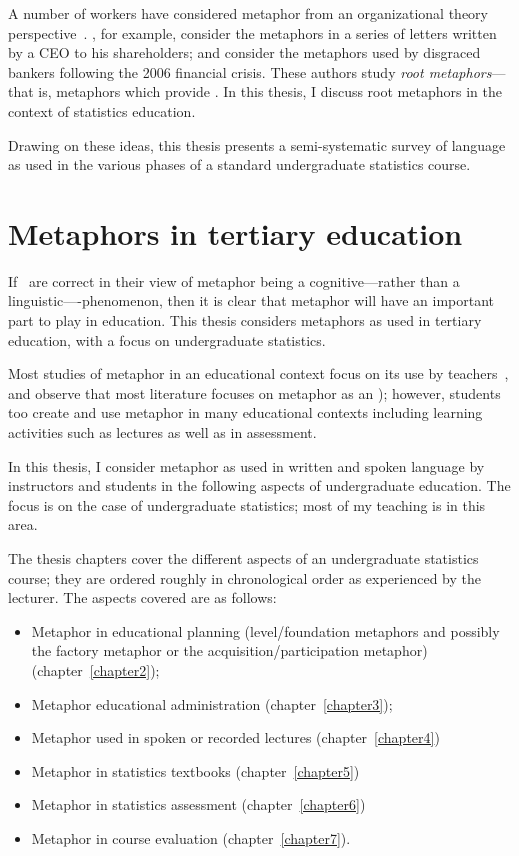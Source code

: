 A number of workers have considered metaphor from an organizational
theory perspective~\citep{cornelissen2012}.  , for
example, consider the metaphors in a series of letters written by a
CEO to his shareholders; and  consider the metaphors
used by disgraced bankers following the 2006 financial crisis.  These
authors study \emph{root metaphors}---that is, metaphors which provide
.  In this thesis, I discuss root metaphors in the
context of statistics education.

Drawing on these ideas, this thesis presents a semi-systematic survey
of language as used in the various phases of a standard undergraduate
statistics course.  

\section{Metaphors in tertiary education}


If~\citeauthor{lakoff1980} are correct in their view of metaphor being
a cognitive---rather than a linguistic----phenomenon, then it is clear
that metaphor will have an important part to play in education.  This
thesis considers metaphors as used in tertiary education, with a focus
on undergraduate statistics.

Most studies of metaphor in an educational context focus on its use by
teachers~\citep{willox2010}, and observe that most literature focuses on
metaphor as an ); however,
students too create and use metaphor in many educational contexts
including learning activities such as lectures as well as in
assessment.

In this thesis, I consider metaphor as used in written and spoken
language by instructors and students in the following aspects of
undergraduate education.  The focus is on the case of undergraduate
statistics; most of my teaching is in this area.

The thesis chapters cover the different aspects of an undergraduate
statistics course; they are ordered roughly in chronological order as
experienced by the lecturer.  The aspects covered are as follows:

\begin{itemize}
\item Metaphor in educational planning (level/foundation metaphors and
  possibly the factory metaphor or the acquisition/participation
  metaphor) (chapter~\ref{chapter2});
\item Metaphor educational administration (chapter~\ref{chapter3});
\item Metaphor used in spoken or recorded lectures (chapter~\ref{chapter4})
\item Metaphor in statistics textbooks (chapter~\ref{chapter5})
\item Metaphor in statistics assessment (chapter~\ref{chapter6})
\item Metaphor in course evaluation (chapter~\ref{chapter7}).
\end{itemize}


